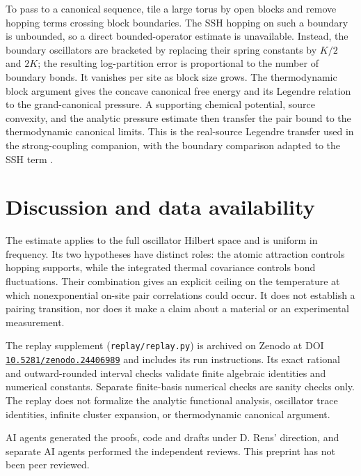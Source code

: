 \documentclass[11pt]{article}
\newcommand*{\SUPPDOI}{10.5281/zenodo.24406989}
\begin{document}
To pass to a canonical sequence, tile a large torus by open blocks and remove hopping terms crossing block boundaries. The SSH hopping on such a boundary is unbounded, so a direct bounded-operator estimate is unavailable. Instead, the boundary oscillators are bracketed by replacing their spring constants by $K/2$ and $2K$; the resulting log-partition error is proportional to the number of boundary bonds. It vanishes per site as block size grows. The thermodynamic block argument gives the concave canonical free energy and its Legendre relation to the grand-canonical pressure. A supporting chemical potential, source convexity, and the analytic pressure estimate then transfer the pair bound to the thermodynamic canonical limits. This is the real-source Legendre transfer used in the strong-coupling companion, with the boundary comparison adapted to the SSH term \cite{strongcoupling}.

\section{Discussion and data availability}

The estimate applies to the full oscillator Hilbert space and is uniform in frequency. Its two hypotheses have distinct roles: the atomic attraction controls hopping supports, while the integrated thermal covariance controls bond fluctuations. Their combination gives an explicit ceiling on the temperature at which nonexponential on-site pair correlations could occur. It does not establish a pairing transition, nor does it make a claim about a material or an experimental measurement.

The replay supplement (\texttt{replay/replay.py}) is archived on Zenodo at DOI \href{https://doi.org/10.5281/zenodo.24406989}{\nolinkurl{\SUPPDOI}} and includes its run instructions. Its exact rational and outward-rounded interval checks validate finite algebraic identities and numerical constants. Separate finite-basis numerical checks are sanity checks only. The replay does not formalize the analytic functional analysis, oscillator trace identities, infinite cluster expansion, or thermodynamic canonical argument.

AI agents generated the proofs, code and drafts under D. Rens' direction, and separate AI agents performed the independent reviews. This preprint has not been peer reviewed.

{\raggedright\small\par}
\end{document}
